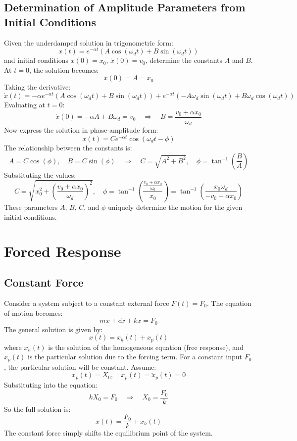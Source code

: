 \subsection{Determination of Amplitude Parameters from Initial Conditions}

Given the underdamped solution in trigonometric form:
\[
x(t) = e^{-\alpha t} (A \cos(\omega_d t) + B \sin(\omega_d t))
\]
and initial conditions \( x(0) = x_0 \), \( \dot{x}(0) = v_0 \), determine the constants \( A \) and \( B \). At \( t = 0 \), the solution becomes:
\[
x(0) = A = x_0
\]
Taking the derivative:
\[
\dot{x}(t) = -\alpha e^{-\alpha t} (A \cos(\omega_d t) + B \sin(\omega_d t)) + e^{-\alpha t} (-A \omega_d \sin(\omega_d t) + B \omega_d \cos(\omega_d t))
\]
Evaluating at \( t = 0 \):
\[
\dot{x}(0) = -\alpha A + B \omega_d = v_0
\quad \Rightarrow \quad 
B = \frac{v_0 + \alpha x_0}{\omega_d}
\]
Now express the solution in phase-amplitude form:
\[
x(t) = C e^{-\alpha t} \cos(\omega_d t - \phi)
\]
The relationship between the constants is:
\[
A = C \cos(\phi), \quad B = C \sin(\phi)
\quad \Rightarrow \quad 
C = \sqrt{A^2 + B^2}, \quad \phi = \tan^{-1} \left( \frac{B}{A} \right)
\]
Substituting the values:
\[
C = \sqrt{x_0^2 + \left( \frac{v_0 + \alpha x_0}{\omega_d} \right)^2}, \quad
\phi = \tan^{-1} \left( \frac{ \frac{v_0 + \alpha x_0}{\omega_d} }{x_0} \right)
= \tan^{-1} \left( \frac{x_0 \omega_d}{-v_0 - \alpha x_0} \right)
\]
These parameters \( A \), \( B \), \( C \), and \( \phi \) uniquely determine the motion for the given initial conditions.

\section{Forced Response}

\subsection{Constant Force}

Consider a system subject to a constant external force \( F(t) = F_0 \). The equation of motion becomes:
\[
m \ddot{x} + c \dot{x} + k x = F_0
\]
The general solution is given by:
\[
x(t) = x_h(t) + x_p(t)
\]
where \( x_h(t) \) is the solution of the homogeneous equation (free response), and \( x_p(t) \) is the particular solution due to the forcing term. For a constant input \( F_0 \), the particular solution will be constant. Assume:
\[
x_p(t) = X_0, \quad \dot{x}_p(t) = \ddot{x}_p(t) = 0
\]
Substituting into the equation:
\[
k X_0 = F_0 \quad \Rightarrow \quad X_0 = \frac{F_0}{k}
\]
So the full solution is:
\[
x(t) = \frac{F_0}{k} + x_h(t)
\]
The constant force simply shifts the equilibrium point of the system.

